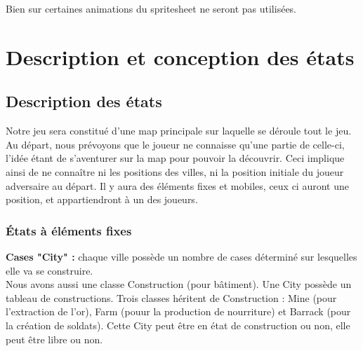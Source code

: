\documentclass[a4paper,12pt]{article}
\begin{document}
Bien sur certaines animations du spritesheet ne seront pas utilisées.



\clearpage
\section{Description et conception des états}

\subsection{Description des états}

Notre jeu sera constitué d'une map principale sur laquelle se déroule tout le jeu. Au départ, nous prévoyons que le joueur ne connaisse qu'une partie de celle-ci, l'idée étant de s'aventurer sur la map pour pouvoir la découvrir. Ceci implique ainsi de ne connaître ni les positions des villes, ni la position initiale du joueur adversaire au départ.
Il y aura des éléments fixes et mobiles, ceux ci auront une position, et appartiendront à un des joueurs.

\subsubsection{États à éléments fixes}


\textbf{Cases "City" : } chaque ville possède un nombre de cases déterminé sur lesquelles elle va se construire.
\\
Nous avons aussi une classe Construction (pour bâtiment). Une City possède un tableau de constructions. Trois classes héritent de Construction : Mine (pour l'extraction de l'or), Farm (pouur la production de nourriture) et Barrack (pour la création de soldats). Cette City peut être en état de construction ou non, elle peut être libre ou non. 
\\
     
\end{document}
